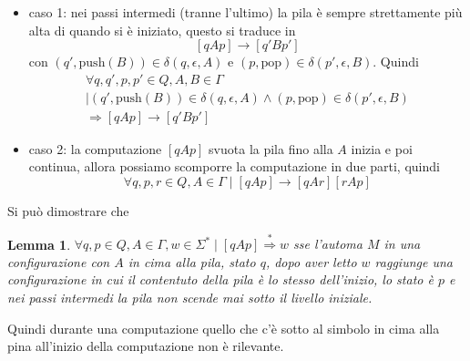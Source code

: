 \documentclass[12pt]{report}
\newtheorem{lemma}{Lemma}
\begin{document}
\begin{itemize}
\begin{figure}[H]
\begin{subfigure}{0.45\textwidth}
			\end{subfigure}
		\end{figure}
		\begin{itemize}
			\item caso 1: nei passi intermedi (tranne l'ultimo) la pila è sempre strettamente più alta di quando si è iniziato, questo si traduce in
				$$ [qAp] \rightarrow [q'Bp'] $$
				con $(q', \text{push}(B)) \in \delta(q, \epsilon, A)$ e $(p, \text{pop}) \in \delta(p', \epsilon, B)$.
				Quindi 
				\begin{multline*}
				\forall q, q', p, p' \in Q, A, B \in \Gamma \\ \mid
					(q', \text{push}(B)) \in \delta(q, \epsilon, A) \wedge (p, \text{pop}) \in \delta(p', \epsilon, B) \\
					\Rightarrow [qAp] \rightarrow [q'Bp'] 
				\end{multline*}
			\item caso 2: la computazione $[qAp]$ svuota la pila fino alla $A$ inizia e poi continua, allora possiamo scomporre la computazione in due parti, quindi
				$$ \forall q, p, r \in Q, A \in \Gamma \mid [qAp] \rightarrow [qAr][rAp] $$
		\end{itemize}
\end{itemize}
Si può dimostrare che
\begin{lemma}
	$\forall q, p \in Q, A \in \Gamma, w \in \Sigma^* \mid [qAp] \overset{*}{\Rightarrow} w$ sse 
	l'automa $M$ in una configurazione con $A$ in cima alla pila, stato $q$, dopo aver letto $w$ raggiunge una configurazione in cui il contentuto della pila è lo stesso dell'inizio, lo stato è $p$ e nei passi intermedi la pila non scende mai sotto il livello iniziale.
\end{lemma}
Quindi durante una computazione quello che c'è sotto al simbolo in cima alla pina all'inizio della computazione non è rilevante.
\end{document}
